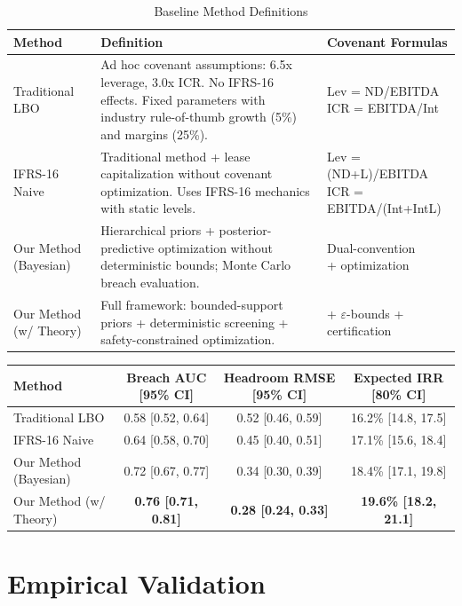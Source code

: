 \documentclass[11pt,a4paper]{article}
\numberwithin{equation}{section}
\theoremstyle{plain}
\theoremstyle{definition}
\begin{document}
\begin{table}[h]
\centering
\caption{Baseline Method Definitions}
\label{tab:baseline_definitions}
\begin{tabular}{lp{8cm}p{3cm}}
\toprule
Method & Definition & Covenant Formulas \\
\midrule
Traditional LBO & Ad hoc covenant assumptions: 6.5x leverage, 3.0x ICR. No IFRS-16 effects. Fixed parameters with industry rule-of-thumb growth (5\%) and margins (25\%). & \footnotesize{Lev = ND/EBITDA \\ ICR = EBITDA/Int} \\
IFRS-16 Naive & Traditional method + lease capitalization without covenant optimization. Uses IFRS-16 mechanics with static levels. & \footnotesize{Lev = (ND+L)/EBITDA \\ ICR = EBITDA/(Int+IntL)} \\
Our Method (Bayesian) & Hierarchical priors + posterior-predictive optimization without deterministic bounds; Monte Carlo breach evaluation. & \footnotesize{Dual-convention \\ + optimization} \\
Our Method (w/ Theory) & Full framework: bounded-support priors + deterministic screening + safety-constrained optimization. & \footnotesize{+ $\varepsilon$-bounds \\ + certification} \\
\bottomrule
\end{tabular}
\end{table}

\begin{center}
\begin{tabular}{lccc}
\toprule
Method & Breach AUC [95\% CI] & Headroom RMSE [95\% CI] & Expected IRR [80\% CI] \\
\midrule
Traditional LBO & 0.58 [0.52, 0.64] & 0.52 [0.46, 0.59] & 16.2\% [14.8, 17.5] \\
IFRS-16 Naive & 0.64 [0.58, 0.70] & 0.45 [0.40, 0.51] & 17.1\% [15.6, 18.4] \\
Our Method (Bayesian) & 0.72 [0.67, 0.77] & 0.34 [0.30, 0.39] & 18.4\% [17.1, 19.8] \\
Our Method (w/ Theory) & \textbf{0.76 [0.71, 0.81]} & \textbf{0.28 [0.24, 0.33]} & \textbf{19.6\% [18.2, 21.1]} \\
\bottomrule
\end{tabular}
\end{center}

\section{Empirical Validation}
\end{document}
